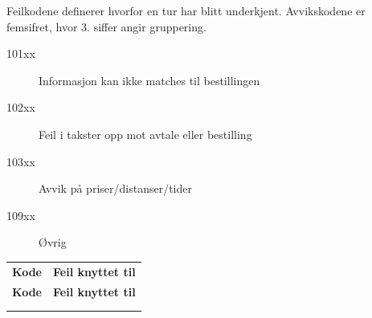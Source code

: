 \documentclass[a4paper,titlepage,norsk,11pt]{article}
\begin{document}
Feilkodene definerer hvorfor en tur har blitt underkjent. Avvikskodene er femsifret, hvor 3. siffer angir gruppering.

\begin{description}
  \item[101xx] Informasjon kan ikke matches til bestillingen
  \item[102xx] Feil i takster opp mot avtale eller bestilling
  \item[103xx] Avvik på priser/distanser/tider
  \item[109xx] Øvrig
\end{description}

\begin{longtabu}to 
\tabucline{-}
\textbf{Kode} & \textbf{Feil knyttet til} \\
\tabucline{-}
\endfirsthead
\tabucline{-}
\textbf{Kode} & \textbf{Feil knyttet til} \\
\tabucline{-}
\endhead
{} \\
\endfoot
\endlastfoot


\end{longtabu}
\end{document}
